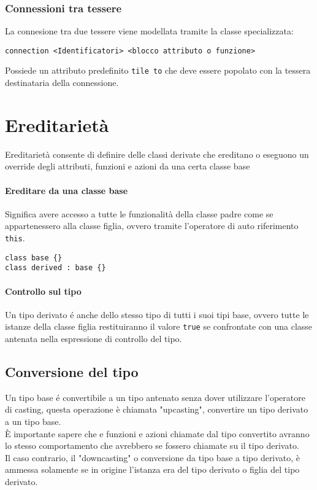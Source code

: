 \subsubsection{Connessioni tra tessere}
La connesione tra due tessere viene modellata tramite la classe specializzata:
\begin{lstlisting}
connection <Identificatori> <blocco attributo o funzione>
\end{lstlisting}
Possiede un attributo predefinito \lstinline|tile to| che deve essere popolato con la tessera 
destinataria della connessione.

\section{Ereditarietà}
Ereditarietà consente di definire delle classi derivate che ereditano o eseguono un override degli attributi, funzioni e azioni 
da una certa classe base \\

\paragraph{Ereditare da una classe base} 
Significa avere accesso a tutte le funzionalità della classe padre come se appartenessero alla classe figlia,
ovvero tramite l'operatore di auto riferimento \lstinline|this|.
\begin{lstlisting}
class base {}
class derived : base {}
\end{lstlisting}

\paragraph{Controllo sul tipo}
Un tipo derivato é anche dello stesso tipo di tutti i suoi tipi base, ovvero tutte le istanze
della classe figlia restituiranno il valore \lstinline|true| se confrontate con una classe 
antenata nella espressione di controllo del tipo. 

\subsection{Conversione del tipo}
Un tipo base é convertibile a un tipo antenato senza dover utilizzare l'operatore di casting,
questa operazione è chiamata "upcasting", convertire un tipo derivato a un tipo base. \\
È importante sapere che e funzioni e azioni chiamate dal tipo convertito avranno 
lo stesso comportamento che avrebbero se fossero chiamate su il tipo derivato. \\
Il caso contrario, il "downcasting" o conversione da tipo base a tipo derivato, è ammessa solamente
se in origine l'istanza era del tipo derivato o figlia del tipo derivato. \\

